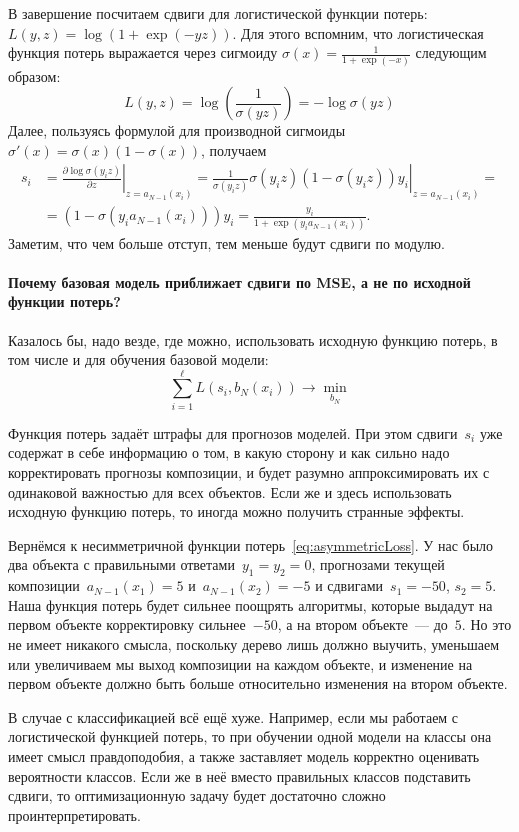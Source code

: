 \documentclass[12pt,fleqn]{article}
\begin{document}
В завершение посчитаем сдвиги для логистической функции потерь:
$L(y, z) = \log (1 + \exp(-yz))$.
Для этого вспомним, что логистическая функция потерь выражается через сигмоиду $\sigma(x) 
= \frac{1}{1 + \exp(-x)}$ следующим образом:
\[
    L(y, z) = \log \left( \frac{1}{\sigma(yz)} \right) = -\log \sigma(yz)
\]
Далее, пользуясь формулой для производной сигмоиды $\sigma'(x) = \sigma(x)(1 - \sigma(x))$,
получаем
\begin{align*}
    s_i &= \left. \frac{\partial \log \sigma(y_i z)}{\partial z} 
        \right|_{z=a_{N-1}(x_i)} =
    \left. \frac{1}{\sigma(y_i z)} \sigma(y_i z) (1 - \sigma(y_i z)) y_i
        \right|_{z=a_{N-1}(x_i)} =\\
    &= (1-\sigma(y_i a_{N-1}(x_i))) y_i =
    \frac{y_i}{1 + \exp(y_i a_{N-1}(x_i))}.
\end{align*}
Заметим, что чем больше отступ, тем меньше будут сдвиги по модулю.

\paragraph{Почему базовая модель приближает сдвиги по MSE, а не по исходной функции потерь?}
Казалось бы, надо везде, где можно, использовать исходную функцию потерь,
в том числе и для обучения базовой модели:
\[
    \sum_{i = 1}^{\ell}
        L(s_i, b_N(x_i))
    \to
    \min_{b_N}
\]

Функция потерь задаёт штрафы для прогнозов моделей.
При этом сдвиги~$s_i$ уже содержат в себе информацию о том, в какую сторону и как сильно
надо корректировать прогнозы композиции, и будет разумно аппроксимировать их
с одинаковой важностью для всех объектов.
Если же и здесь использовать исходную функцию потерь, то иногда можно
получить странные эффекты.

Вернёмся к несимметричной функции потерь~\eqref{eq:asymmetricLoss}.
У нас было два объекта с правильными ответами~$y_1 = y_2 = 0$,
прогнозами текущей композиции~$a_{N - 1}(x_1) = 5$ и~$a_{N - 1}(x_2) = -5$
и сдвигами~$s_1 = -50$, $s_2 = 5$.
Наша функция потерь будет сильнее поощрять алгоритмы,
которые выдадут на первом объекте корректировку сильнее~$-50$,
а на втором объекте~--- до~$5$.
Но это не имеет никакого смысла, поскольку дерево лишь должно выучить, уменьшаем или увеличиваем мы
выход композиции на каждом объекте, и изменение на первом объекте должно быть больше относительно изменения
на втором объекте.

В случае с классификацией всё ещё хуже.
Например, если мы работаем с логистической функцией потерь, то
при обучении одной модели на классы она имеет смысл правдоподобия,
а также заставляет модель корректно оценивать вероятности классов.
Если же в неё вместо правильных классов подставить сдвиги, то оптимизационную задачу
будет достаточно сложно проинтерпретировать.
\end{document}
